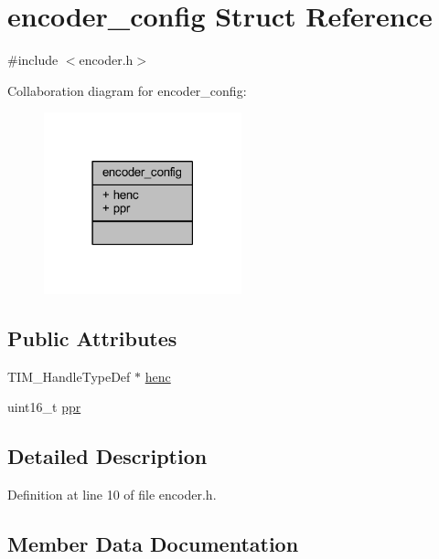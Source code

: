 \hypertarget{structencoder__config}{}\section{encoder\+\_\+config Struct Reference}
\label{structencoder__config}


{\ttfamily \#include $<$encoder.\+h$>$}



Collaboration diagram for encoder\+\_\+config\+:
\nopagebreak
\begin{figure}[H]
\begin{center}
\leavevmode
\includegraphics[width=162pt]{structencoder__config__coll__graph}
\end{center}
\end{figure}
\subsection*{Public Attributes}
\begin{DoxyCompactItemize}
\item 
T\+I\+M\+\_\+\+Handle\+Type\+Def $\ast$ \mbox{\hyperlink{structencoder__config_a125e5144655af6342d91ea30da9a4189}{henc}}
\item 
uint16\+\_\+t \mbox{\hyperlink{structencoder__config_afb9cd180fa1749a182f6178a4f417280}{ppr}}
\end{DoxyCompactItemize}


\subsection{Detailed Description}


Definition at line 10 of file encoder.\+h.



\subsection{Member Data Documentation}
\mbox{\label{structencoder__config_a125e5144655af6342d91ea30da9a4189}} 
